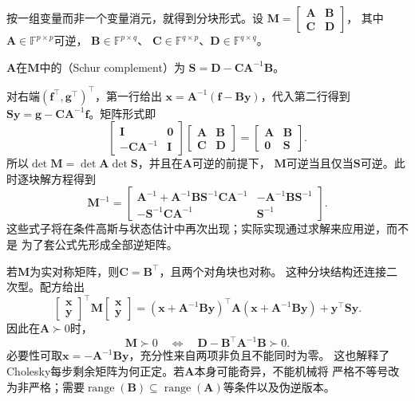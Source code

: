 按一组变量而非一个变量消元，就得到分块形式。设
$\bm M=\left[\begin{smallmatrix}\bm A&\bm B\\\bm C&\bm D\end{smallmatrix}\right]$，
其中$\bm A\in\mathbb F^{p\times p}$可逆，
$\bm B\in\mathbb F^{p\times q}$、
$\bm C\in\mathbb F^{q\times p}$、$\bm D\in\mathbb F^{q\times q}$。
\begin{definition}[Schur补]
\label{def:matrix-analysis-schur-complement}
$\bm A$在$\bm M$中的（Schur complement）为
$\bm S=\bm D-\bm C\bm A^{-1}\bm B$。
\end{definition}
对右端$(\bm f^\top,\bm g^\top)^\top$，第一行给出
$\bm x=\bm A^{-1}(\bm f-\bm B\bm y)$，代入第二行得到
$\bm S\bm y=\bm g-\bm C\bm A^{-1}\bm f$。矩阵形式即
\begin{equation}
 \begin{bmatrix}\bm I&\bm0\\-\bm C\bm A^{-1}&\bm I\end{bmatrix}
 \begin{bmatrix}\bm A&\bm B\\\bm C&\bm D\end{bmatrix}
 =\begin{bmatrix}\bm A&\bm B\\\bm0&\bm S\end{bmatrix}.
 \label{eq:matrix-analysis-schur-complement}
\end{equation}
所以$\det\bm M=\det\bm A\det\bm S$，并且在$\bm A$可逆的前提下，
$\bm M$可逆当且仅当$\bm S$可逆。此时逐块解方程得到
\begin{equation}
 \bm M^{-1}=
 \begin{bmatrix}
 \bm A^{-1}+\bm A^{-1}\bm B\bm S^{-1}\bm C\bm A^{-1}
 &-\bm A^{-1}\bm B\bm S^{-1}\\
 -\bm S^{-1}\bm C\bm A^{-1}&\bm S^{-1}
 \end{bmatrix}.
 \label{eq:matrix-analysis-block-inverse}
\end{equation}
这些式子将在条件高斯与状态估计中再次出现；实际实现通过求解来应用逆，而不是
为了套公式先形成全部逆矩阵。

若$\bm M$为实对称矩阵，则$\bm C=\bm B^\top$，且两个对角块也对称。
这种分块结构还连接二次型。配方给出
\[
 \begin{bmatrix}\bm x\\\bm y\end{bmatrix}^{\top}
 \bm M\begin{bmatrix}\bm x\\\bm y\end{bmatrix}
 =(\bm x+\bm A^{-1}\bm B\bm y)^\top
   \bm A(\bm x+\bm A^{-1}\bm B\bm y)+\bm y^\top\bm S\bm y.
\]
因此在$\bm A\succ0$时，
\begin{equation}
 \bm M\succ0
 \quad\Longleftrightarrow\quad
 \bm D-\bm B^\top\bm A^{-1}\bm B\succ0.
 \label{eq:matrix-analysis-schur-positive-definite}
\end{equation}
必要性可取$\bm x=-\bm A^{-1}\bm B\bm y$，充分性来自两项非负且不能同时为零。
这也解释了Cholesky每步剩余矩阵为何正定。若$\bm A$本身可能奇异，不能机械将
严格不等号改为非严格；需要$\operatorname{range}(\bm B)\subseteq
\operatorname{range}(\bm A)$等条件以及伪逆版本。

